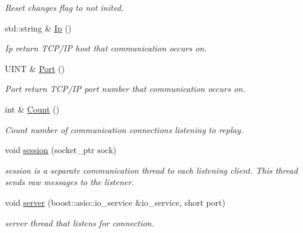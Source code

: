 \begin{DoxyCompactItemize}
\begin{DoxyCompactList}\small\item\em Reset changes flag to not inited. \end{DoxyCompactList}\item 
std\+::string \& \hyperlink{class_socket_back_end_a0d76ca4f61c999209cf291f85eb58ba1}{Ip} ()
\begin{DoxyCompactList}\small\item\em Ip return T\+C\+P/\+I\+P host that communication occurs on. \end{DoxyCompactList}\item 
U\+I\+N\+T \& \hyperlink{class_socket_back_end_a7b313c5bcfba01c8594974e2c882d75a}{Port} ()
\begin{DoxyCompactList}\small\item\em Port return T\+C\+P/\+I\+P port number that communication occurs on. \end{DoxyCompactList}\item 
int \& \hyperlink{class_socket_back_end_ac36c4edf7bb2fa8551db4a55e3c34d72}{Count} ()
\begin{DoxyCompactList}\small\item\em Count number of communication connections listening to replay. \end{DoxyCompactList}\item 
void \hyperlink{class_socket_back_end_a4dfd8989e98bed1bd71e70272ae0f960}{session} (socket\+\_\+ptr sock)
\begin{DoxyCompactList}\small\item\em session is a separate communication thread to each listening client. This thread sends raw messages to the listener. \end{DoxyCompactList}\item 
void \hyperlink{class_socket_back_end_ac81e94ba59eaa60d9e64ba8eaae77691}{server} (boost\+::asio\+::io\+\_\+service \&io\+\_\+service, short port)
\begin{DoxyCompactList}\small\item\em server thread that listens for connection. \end{DoxyCompactList}\end{DoxyCompactItemize}
